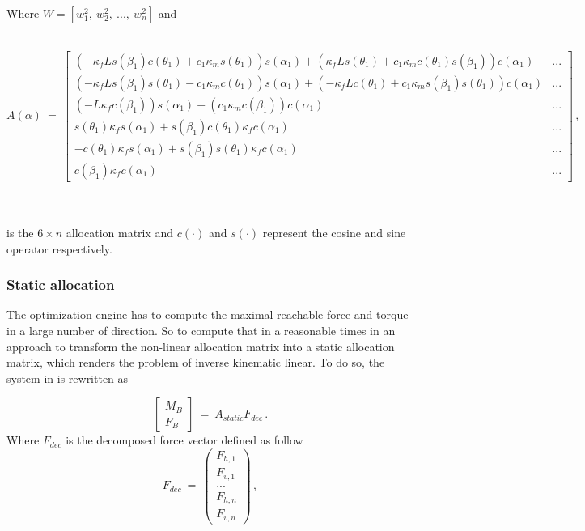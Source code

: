 Where $W = [w_1^2,\ w_2^2,\ ...,\ w_n^2]$ and\\\\
\centerline{\begingroup
    \fontsize{9pt}{11pt}\selectfont
$A(\alpha) \ = \
\begin{bmatrix}
  (-\kappa_f L s(\beta_1) c(\theta_1) +c_1\kappa_m s(\theta_1)) s(\alpha_1)
  + (\kappa_f L s(\theta_1) +c_1 \kappa_m c(\theta_1) s(\beta_1)) c(\alpha_1) & ...\\
  (-\kappa_f L s(\beta_1) s(\theta_1) - c_1 \kappa_m c(\theta_1)) s(\alpha_1)
  + (-\kappa_f L c(\theta_1) +c_1 \kappa_m s(\beta_1) s(\theta_1)) c(\alpha_1) & ...\\
  (-L \kappa_f c(\beta_1)) s(\alpha_1) +(c_1 \kappa_m c(\beta_1)) c(\alpha_1) & ...\\
  s(\theta_1) \kappa_f s(\alpha_1) + s(\beta_1) c(\theta_1) \kappa_f c(\alpha_1) & ...\\
  -c(\theta_1) \kappa_f s(\alpha_1) +s(\beta_1) s(\theta_1) \kappa_f c(\alpha_1) & ...\\
  c(\beta_1) \kappa_f c(\alpha_1) & ...
\end{bmatrix} \, ,$
\endgroup}\\\\
is the $6 \times n$ allocation matrix and $c(\cdot)$ and $s(\cdot)$ represent the
cosine and sine operator respectively.

\subsubsection{Static allocation}
\label{sec:allocation}
The optimization engine has to compute the maximal reachable force and torque in
a large number of direction. So to compute that in a reasonable times in
\citep{kamel_voliro:_2018} an approach to transform the non-linear allocation matrix
into a static allocation matrix, which renders the problem of inverse kinematic
linear. To do so, the system in \Cref{force_eq} is rewritten as

\begin{equation}
  \label{static_force_eq}
    \begin{bmatrix}
      M_B \\
      F_B
    \end{bmatrix} \ = \
    A_{static}F_{dec}
    \, .
\end{equation}
Where $F_{dec}$ is the decomposed force vector defined as follow
\begin{equation}
  \label{f_dec}
    F_{dec} \ = \
    \begin{pmatrix}
      F_{h,1} \\
      F_{v,1} \\
      ... \\
      F_{h,n} \\
      F_{v,n}
    \end{pmatrix} \, ,
\end{equation}

